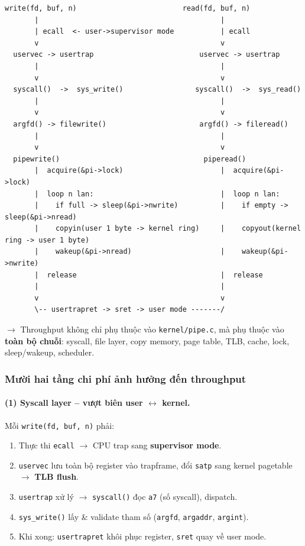 \documentclass[11pt,a4paper]{article}
\begin{document}
\begin{lstlisting}[style=plain]
  write(fd, buf, n)                         read(fd, buf, n)
       |                                           |
       | ecall  <- user->supervisor mode           | ecall
       v                                           v
  uservec -> usertrap                         uservec -> usertrap
       |                                           |
       v                                           v
  syscall()  ->  sys_write()                 syscall()  ->  sys_read()
       |                                           |
       v                                           v
  argfd() -> filewrite()                      argfd() -> fileread()
       |                                           |
       v                                           v
  pipewrite()                                  piperead()
       |  acquire(&pi->lock)                       |  acquire(&pi->lock)
       |  loop n lan:                              |  loop n lan:
       |    if full -> sleep(&pi->nwrite)          |    if empty -> sleep(&pi->nread)
       |    copyin(user 1 byte -> kernel ring)     |    copyout(kernel ring -> user 1 byte)
       |    wakeup(&pi->nread)                     |    wakeup(&pi->nwrite)
       |  release                                  |  release
       |                                           |
       v                                           v
       \-- usertrapret -> sret -> user mode -------/
\end{lstlisting}

$\rightarrow$ Throughput không chỉ phụ thuộc vào \texttt{kernel/pipe.c}, mà phụ thuộc vào \textbf{toàn bộ chuỗi}: syscall, file layer, copy memory, page table, TLB, cache, lock, sleep/wakeup, scheduler.

\subsubsection{Mười hai tầng chi phí ảnh hưởng đến throughput}

\paragraph{(1) Syscall layer -- vượt biên user $\leftrightarrow$ kernel.}
Mỗi \texttt{write(fd, buf, n)} phải:

\begin{enumerate}
  \item Thực thi \texttt{ecall} $\rightarrow$ CPU trap sang \textbf{supervisor mode}.
  \item \texttt{uservec} lưu toàn bộ register vào trapframe, đổi \texttt{satp} sang kernel pagetable $\rightarrow$ \textbf{TLB flush}.
  \item \texttt{usertrap} xử lý $\rightarrow$ \texttt{syscall()} đọc \texttt{a7} (số syscall), dispatch.
  \item \texttt{sys\_write()} lấy \& validate tham số (\texttt{argfd}, \texttt{argaddr}, \texttt{argint}).
  \item Khi xong: \texttt{usertrapret} khôi phục register, \texttt{sret} quay về user mode.
\end{enumerate}
\end{document}
